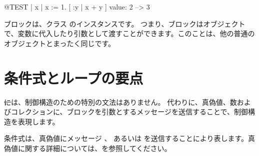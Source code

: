 \documentclass[a4paper,10pt,twoside]{book}
\begin{document}
\begin{code}{@TEST}
| x |
x := 1.
[ :y | x + y ] value: 2 --> 3
\end{code}

ブロックは、クラス  のインスタンスです。
つまり、ブロックはオブジェクトで、変数に代入したり引数として渡すことができます。このことは、他の普通のオブジェクトとまったく同じです。






\section{条件式とループの要点}

\st には、制御構造のための特別の文法はありません。
代わりに、真偽値、数およびコレクションに、ブロックを引数とするメッセージを送信することで、制御構造を表現します。

条件式は、真偽値にメッセージ 、 あるいは  を送信することにより表します。真偽値に関する詳細については、を参照してください。
\end{document}
